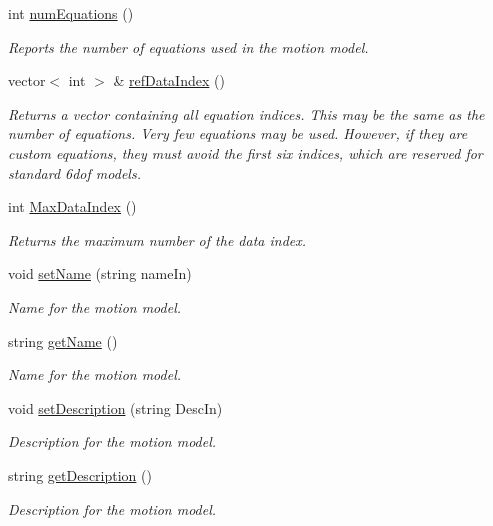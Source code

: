 \begin{DoxyCompactItemize}
int \hyperlink{class_motion_model_a0a228c24a524e2a1c6636d3121a842be}{num\-Equations} ()
\begin{DoxyCompactList}\small\item\em Reports the number of equations used in the motion model. \end{DoxyCompactList}\item 
vector$<$ int $>$ \& \hyperlink{class_motion_model_ac62401cfe337e9404867819c529f2300}{ref\-Data\-Index} ()
\begin{DoxyCompactList}\small\item\em Returns a vector containing all equation indices. This may be the same as the number of equations. Very few equations may be used. However, if they are custom equations, they must avoid the first six indices, which are reserved for standard 6dof models. \end{DoxyCompactList}\item 
int \hyperlink{class_motion_model_a81ed21162a09ffce06043f3a7fb4213d}{Max\-Data\-Index} ()
\begin{DoxyCompactList}\small\item\em Returns the maximum number of the data index. \end{DoxyCompactList}\item 
void \hyperlink{class_motion_model_ad0da46b7982308fedcd87331f9d47d18}{set\-Name} (string name\-In)
\begin{DoxyCompactList}\small\item\em Name for the motion model. \end{DoxyCompactList}\item 
string \hyperlink{class_motion_model_af9fd1e58735b7f47bc5d5257bdca9139}{get\-Name} ()
\begin{DoxyCompactList}\small\item\em Name for the motion model. \end{DoxyCompactList}\item 
void \hyperlink{class_motion_model_a48cc314ff0f0c831c40bf1c399240b17}{set\-Description} (string Desc\-In)
\begin{DoxyCompactList}\small\item\em Description for the motion model. \end{DoxyCompactList}\item 
string \hyperlink{class_motion_model_a8594356137407b25d03927a68a422dc9}{get\-Description} ()
\begin{DoxyCompactList}\small\item\em Description for the motion model. \end{DoxyCompactList}\item 

\end{DoxyCompactItemize}
